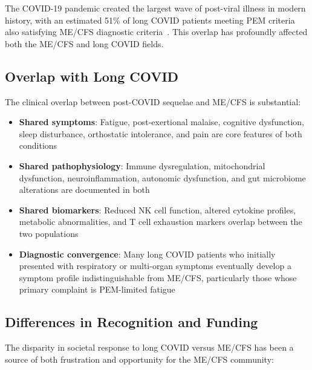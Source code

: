 The COVID-19 pandemic created the largest wave of post-viral illness in modern history, with an estimated 51\% of long COVID patients meeting PEM criteria also satisfying ME/CFS diagnostic criteria~\cite{Komaroff2023}. This overlap has profoundly affected both the ME/CFS and long COVID fields.

\subsection{Overlap with Long COVID}

The clinical overlap between post-COVID sequelae and ME/CFS is substantial:

\begin{itemize}
    \item \textbf{Shared symptoms}: Fatigue, post-exertional malaise, cognitive dysfunction, sleep disturbance, orthostatic intolerance, and pain are core features of both conditions
    \item \textbf{Shared pathophysiology}: Immune dysregulation, mitochondrial dysfunction, neuroinflammation, autonomic dysfunction, and gut microbiome alterations are documented in both
    \item \textbf{Shared biomarkers}: Reduced NK cell function, altered cytokine profiles, metabolic abnormalities, and T cell exhaustion markers overlap between the two populations
    \item \textbf{Diagnostic convergence}: Many long COVID patients who initially presented with respiratory or multi-organ symptoms eventually develop a symptom profile indistinguishable from ME/CFS, particularly those whose primary complaint is PEM-limited fatigue
\end{itemize}

\subsection{Differences in Recognition and Funding}

The disparity in societal response to long COVID versus ME/CFS has been a source of both frustration and opportunity for the ME/CFS community:

